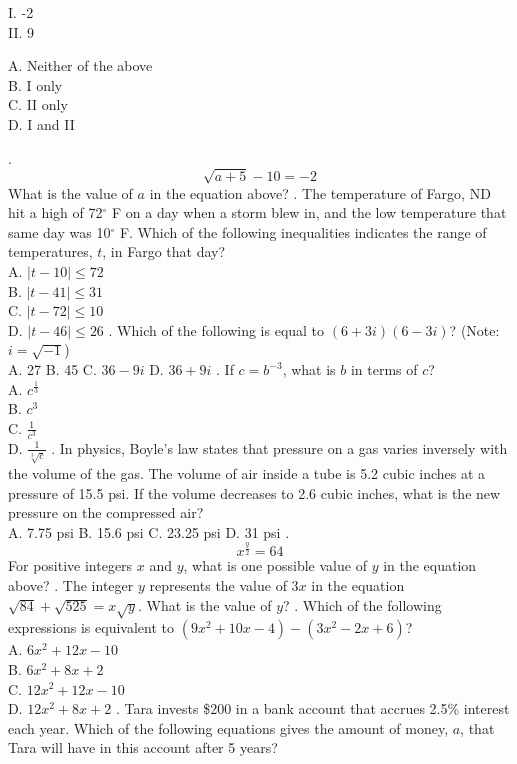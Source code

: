 \documentclass[../satmath.tex]{subfiles}
\begin{document}
\begin{enumerate}[label=\bfseries\arabic*.]
I. -2 \\
II. 9

A. Neither of the above\\
B. I only\\
C. II only\\
D. I and II 

. 
\[\sqrt{a+5}-10=-2\]
What is the value of $a$ in the equation above?
. The temperature of Fargo, ND hit a high of 72$^{\circ}$ F on a day when a storm blew in, and the low temperature that same day was 
10$^{\circ}$ F. Which of the following inequalities indicates the range of temperatures, $t$, in Fargo that day?\\
A. $|t-10|\leq 72$\\
B. $|t-41|\leq 31$\\
C. $|t-72|\leq 10$\\
D. $|t-46|\leq 26$
. Which of the following is equal to $(6+3i)(6-3i)$? (Note: $i=\sqrt{-1}$)\\
A. 27 \quad B. 45 \quad C. $36-9i$ \quad D. $36+9i$
. If $c=b^{-3}$, what is $b$ in terms of $c$?\\
A. $c^{\frac{1}{3}}$\\
B. $c^3$\\
C. $\frac{1}{c^3}$\\
D. $\frac{1}{\sqrt[3]{c}}$
. In physics, Boyle's law states that pressure on a gas varies inversely with the volume of the gas. The volume of air inside a tube is 
5.2 cubic inches at a pressure of 15.5 psi. If the volume decreases to 2.6 cubic inches, what is the new pressure on the compressed air?\\
A. 7.75 psi \quad B. 15.6 psi \quad C. 23.25 psi \quad D. 31 psi 
. 
\[x^{\frac{y}{2}}=64\]
For positive integers $x$ and $y$, what is one possible value of $y$ in the equation above?
. The integer $y$ represents the value of $3x$ in the equation $\sqrt{84}+\sqrt{525}=x\sqrt{y}$. What is the value of $y$?
. Which of the following expressions is equivalent to $(9x^2+10x-4)-(3x^2-2x+6)$?\\
A. $6x^2+12x-10$\\
B. $6x^2+8x+2$\\
C. $12x^2+12x-10$\\
D. $12x^2+8x+2$
. Tara invests \$200 in a bank account that accrues 2.5\% interest each year. Which of the following equations gives the amount of money, $a$, that
Tara will have in this account after 5 years?\\

\end{enumerate}
\end{document}

